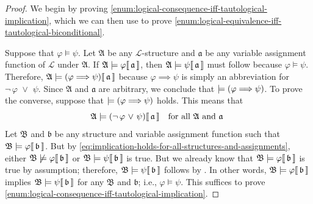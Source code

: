 \begin{proof}
    We begin by proving \ref{enum:logical-consequence-iff-tautological-implication}, which we can then use to prove \ref{enum:logical-equivalence-iff-tautological-biconditional}.

    \vspace{0.3cm}
    \noindent
    Suppose that \( \varphi \models \psi \). Let \( \mathfrak{A} \) be any \( \mathcal{L} \)-structure and \( \mathfrak{a} \) be any
    variable assignment function of \( \mathcal{L} \) under \( \mathfrak{A} \).
    If \(  \mathfrak{A} \models \varphi\llbracket\, \mathfrak{a} \,\rrbracket \), then \(  \mathfrak{A} \models \psi\llbracket\, \mathfrak{a} \,\rrbracket \)
    must follow because \( \varphi \models \psi \).
    Therefore, \( \folwffsatisfaction{\mathfrak{A}}{\mleft( \varphi {\implies} \psi \mright)}{\mathfrak{a}} \) because
    \( \varphi {\implies} \psi \) is simply an abbreviation for \( \lnot \, \varphi \,\,{\lor}\,\, \psi \).
    Since \( \mathfrak{A} \) and \( \mathfrak{a} \) are arbitrary, we conclude that \( \models \mleft( \varphi {\implies} \psi \mright) \).
    To prove the converse, suppose that \( \models \mleft( \varphi {\implies} \psi \mright) \) holds.
    This means that
    \begin{equation}
        \label{eq:implication-holds-for-all-structures-and-assignments}
        \folwffsatisfaction{\mathfrak{A}}{\mleft( \lnot \, \varphi \,\,{\lor}\,\, \psi \mright)}{\mathfrak{a}} \ \ \  \text{for all \( \mathfrak{A} \) and \( \mathfrak{a} \) }
    \end{equation}
    Let \( \mathfrak{B} \) and \( \mathfrak{b} \) be any structure and variable assignment function such that \(  \mathfrak{B} \models \varphi\llbracket\, \mathfrak{b} \,\rrbracket \).
    But by \eqref{eq:implication-holds-for-all-structures-and-assignments}, either \(  \mathfrak{B} \not\models \varphi\llbracket\,\mathfrak{b} \,\rrbracket \)
    or \(  \mathfrak{B} \models \psi\llbracket\, \mathfrak{b} \,\rrbracket \) is true.
    But we already know that \(  \mathfrak{B} \models \varphi\llbracket\, \mathfrak{b} \,\rrbracket \) is true by assumption; therefore,
    \(  \mathfrak{B} \models \psi\llbracket\, \mathfrak{b} \,\rrbracket \) follows by .
    In other words, \(  \mathfrak{B} \models \varphi\llbracket\, \mathfrak{b} \,\rrbracket \) implies \(  \mathfrak{B} \models \psi\llbracket\, \mathfrak{b} \,\rrbracket \)
    for any \( \mathfrak{B} \) and \( \mathfrak{b} \); i.e., \( \varphi \models \psi \).
    This suffices to prove \ref{enum:logical-consequence-iff-tautological-implication}.


\end{proof}

